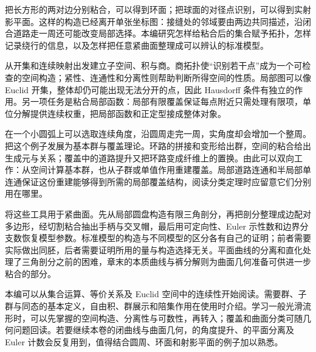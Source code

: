
% 

\BookPartGuide

把长方形的两对边分别粘合，可以得到环面；把球面的对径点识别，可以得到实射影平面。这样的构造已经离开单张坐标图：接缝处的邻域要由两边共同描述，沿闭合道路走一周还可能改变局部选择。本编研究怎样给粘合后的集合赋予拓扑，怎样记录绕行的信息，以及怎样把任意紧曲面整理成可以辨认的标准模型。

\ProseParagraphBreak

从开集和连续映射出发建立子空间、积与商。商拓扑使“识别若干点”成为一个可检查的空间构造；紧性、连通性和分离性则帮助判断所得空间的性质。局部图可以像 Euclid 开集，整体却仍可能出现无法分开的点，因此 Hausdorff 条件有独立的作用。另一项任务是粘合局部函数：局部有限覆盖保证每点附近只需处理有限项，单位分解提供连续权重，把局部函数和正定型接成整体对象。

\ProseParagraphBreak

在一个小圆弧上可以选取连续角度，沿圆周走完一周，实角度却会增加一个整周。把这个例子发展为基本群与覆盖理论。环路的拼接和变形给出群，空间的粘合给出生成元与关系；覆盖中的道路提升又把环路变成纤维上的置换。由此可以双向工作：从空间计算基本群，也从子群或单值作用重建覆盖。局部道路连通和半局部单连通保证这份重建能够得到所需的局部覆盖结构，阅读分类定理时应留意它们分别用在哪里。

\ProseParagraphBreak

将这些工具用于紧曲面。先从局部圆盘构造有限三角剖分，再把剖分整理成边配对多边形，经切割粘合抽出手柄与交叉帽，最后用可定向性、Euler 示性数和边界分支数恢复模型参数。标准模型的构造与不同模型的区分各有自己的证明；前者需要实际做出同胚，后者需要证明所用的量与构造选择无关。平面曲线的分离和直化处理了三角剖分之前的困难，章末的本质曲线与裤分解则为曲面几何准备可供进一步粘合的部分。

\ProseParagraphBreak

本编可以从集合运算、等价关系及 Euclid 空间中的连续性开始阅读。需要群、子群与同态的基本定义，自由积、群展示和陪集作用在使用时介绍。学习一般光滑流形时，可以先掌握的空间构造、分离性与可数性，再转入；覆盖和曲面分类可随几何问题回读。若要继续本卷的闭曲线与曲面几何，的角度提升、的平面分离及 Euler 计数会反复用到，值得结合圆周、环面和射影平面的例子加以熟悉。




